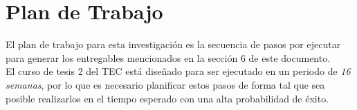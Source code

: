 \section{\textbf{Plan de Trabajo}}
El plan de trabajo para esta investigaci\'on es la secuencia de pasos por ejecutar
para generar los entregables mencionados en la secci\'on 6 de este documento.\\
El curso de tesis 2 del TEC est\'a dise\~nado para ser ejecutado en un periodo de \textit{16 semanas}, por lo que es necesario planificar estos pasos de forma tal que sea posible realizarlos en el tiempo esperado con una alta probabilidad de \'exito.